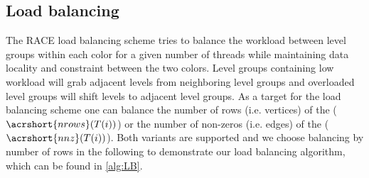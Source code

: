   \subsection{Load balancing}\label{subsec:LB} 
The RACE load balancing scheme tries to balance the workload between level groups within each color for a given number of threads while maintaining data locality and \DK constraint between the two colors. Level groups containing low workload will grab adjacent levels from neighboring level groups and overloaded level groups will shift levels to adjacent level groups. As a target for the load balancing scheme one can balance the number of rows (i.e. vertices) of the \levelGroups ($\acrshort{nrows}(T(i))$)  or the number of non-zeros (i.e. edges) of the \levelGroups ($\acrshort{nnz}(T(i))$). Both variants are supported and we choose balancing by number of rows in the following to demonstrate our load balancing algorithm, which can be found in \cref{alg:LB}.
 

